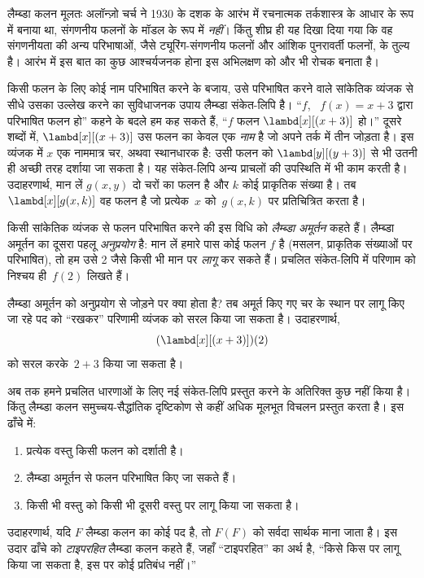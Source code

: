 \documentclass[../../../include/open-logic-section]{subfiles}
\begin{document}

लैम्ब्डा कलन मूलतः अलॉन्ज़ो चर्च ने 1930 के दशक के आरंभ में रचनात्मक
तर्कशास्त्र के आधार के रूप में बनाया था, संगणनीय फलनों के मॉडल के रूप में
\emph{नहीं}। किंतु शीघ्र ही यह दिखा दिया गया कि वह संगणनीयता की अन्य
परिभाषाओं, जैसे ट्यूरिंग-संगणनीय फलनों और आंशिक पुनरावर्ती फलनों, के तुल्य
है। आरंभ में इस बात का कुछ आश्चर्यजनक होना इस अभिलक्षण को और भी रोचक बनाता
है।

किसी फलन के लिए कोई नाम परिभाषित करने के बजाय, उसे परिभाषित करने वाले
सांकेतिक व्यंजक से सीधे उसका उल्लेख करने का सुविधाजनक उपाय लैम्ब्डा
संकेत-लिपि है। ``$f$, ~$f(x) = x + 3$ द्वारा परिभाषित फलन हो'' कहने के
बदले हम कह सकते हैं, ``$f$ फलन $\lambd[x][(x + 3)]$ हो।'' दूसरे शब्दों
में, $\lambd[x][(x+3)]$ उस फलन का केवल एक \emph{नाम} है जो अपने तर्क में
तीन जोड़ता है। इस व्यंजक में $x$ एक नाममात्र चर, अथवा स्थानधारक है: उसी
फलन को $\lambd[y][(y + 3)]$ से भी उतनी ही अच्छी तरह दर्शाया जा सकता है। यह
संकेत-लिपि अन्य प्राचलों की उपस्थिति में भी काम करती है। उदाहरणार्थ, मान
लें $g(x, y)$ दो चरों का फलन है और $k$ कोई प्राकृतिक संख्या है। तब
$\lambd[x][g(x,k)]$ वह फलन है जो प्रत्येक~$x$ को~$g(x, k)$ पर प्रतिचित्रित
करता है।

किसी सांकेतिक व्यंजक से फलन परिभाषित करने की इस विधि को \emph{लैम्ब्डा
अमूर्तन} कहते हैं। लैम्ब्डा अमूर्तन का दूसरा पहलू \emph{अनुप्रयोग} है:
मान लें हमारे पास कोई फलन $f$ है (मसलन, प्राकृतिक संख्याओं पर परिभाषित),
तो हम उसे 2 जैसे किसी भी मान पर \emph{लागू} कर सकते हैं। प्रचलित
संकेत-लिपि में परिणाम को निश्चय ही~$f(2)$ लिखते हैं।

लैम्ब्डा अमूर्तन को अनुप्रयोग से जोड़ने पर क्या होता है? तब अमूर्त किए गए
चर के स्थान पर लागू किए जा रहे पद को ``रखकर'' परिणामी व्यंजक को सरल किया
जा सकता है। उदाहरणार्थ,
\[
(\lambd[x][(x + 3)])(2)
\]
को सरल करके~$2 + 3$ किया जा सकता है।

अब तक हमने प्रचलित धारणाओं के लिए नई संकेत-लिपि प्रस्तुत करने के अतिरिक्त
कुछ नहीं किया है। किंतु लैम्ब्डा कलन समुच्चय-सैद्धांतिक दृष्टिकोण से कहीं
अधिक मूलभूत विचलन प्रस्तुत करता है। इस ढाँचे में:
\begin{enumerate}
\item प्रत्येक वस्तु किसी फलन को दर्शाती है।
\item लैम्ब्डा अमूर्तन से फलन परिभाषित किए जा सकते हैं।
\item किसी भी वस्तु को किसी भी दूसरी वस्तु पर लागू किया जा सकता है।
\end{enumerate}
उदाहरणार्थ, यदि $F$ लैम्ब्डा कलन का कोई पद है, तो $F(F)$ को सर्वदा
सार्थक माना जाता है। इस उदार ढाँचे को \emph{टाइपरहित} लैम्ब्डा कलन कहते
हैं, जहाँ ``टाइपरहित'' का अर्थ है, ``किसे किस पर लागू किया जा सकता है, इस
पर कोई प्रतिबंध नहीं।''
\end{document}
